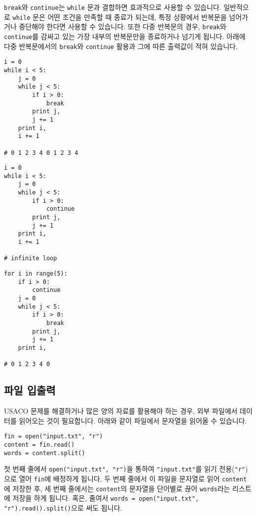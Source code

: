 \documentclass[../main.tex]{subfiles}
\begin{document}
\texttt{break}와 \texttt{continue}는 \texttt{while} 문과 결합하면 효과적으로 사용할 수 있습니다.
일반적으로 \texttt{while} 문은 어떤 조건을 만족할 때 종료가 되는데, 특정 상황에서 반복문을 넘어가거나 중단해야 한다면 사용할 수 있습니다.
또한 다중 반복문의 경우, \texttt{break}와 \texttt{continue}를 감싸고 있는 가장 내부의 반복문만을 종료하거나 넘기게 됩니다.
아래에 다중 반복문에서의 \texttt{break}와 \texttt{continue} 활용과 그에 따른 출력값이 적혀 있습니다.
\begin{verbatim}
i = 0
while i < 5:
	j = 0
	while j < 5:
		if i > 0:
			break
		print j,
		j += 1
	print i,
	i += 1

# 0 1 2 3 4 0 1 2 3 4
\end{verbatim}
\begin{verbatim}
i = 0
while i < 5:
	j = 0
	while j < 5:
		if i > 0:
			continue
		print j,
		j += 1
	print i,
	i += 1

# infinite loop
\end{verbatim}
\begin{verbatim}
for i in range(5):
	if i > 0:
		continue
	j = 0
	while j < 5:
		if i > 0:
			break
		print j,
		j += 1
	print i,

# 0 1 2 3 4 0
\end{verbatim}

\subsection{파일 입출력}
USACO 문제를 해결하거나 많은 양의 자료를 활용해야 하는 경우, 외부 파일에서 데이터를 읽어오는 것이 필요합니다.
아래와 같이 파일에서 문자열을 읽어올 수 있습니다.
\begin{verbatim}
fin = open("input.txt", "r")
content = fin.read()
words = content.split()
\end{verbatim}
첫 번째 줄에서 \texttt{open("input.txt", "r")}을 통하여 \texttt{"input.txt"}를 읽기 전용(\texttt{"r"})으로 열어 \texttt{fin}에 배정하게 됩니다.
두 번째 줄에서 이 파일을 문자열로 읽어 \texttt{content}에 저장한 후, 세 번째 줄에서는 \texttt{content}의 문자열을 단어별로 끊어 \texttt{words}라는 리스트에 저장을 하게 됩니다.
혹은, 줄여서 \texttt{words = open("input.txt", "r").read().split()}으로 써도 됩니다.
\end{document}
